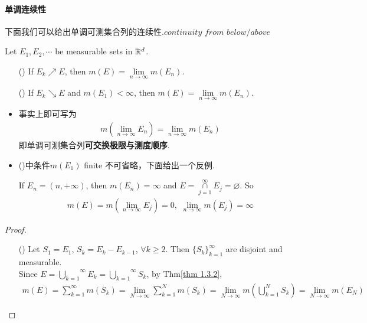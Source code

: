 \paragraph{单调连续性}
	下面我们可以给出单调可测集合列的连续性.$continuity \,\, from \,\, below / above$
	\begin{thm}\label{thm 1.3.3}
		Let $E_1 , E_2 , \cdots$ be measurable sets in $\mathbb{R}^d$.
		\begin{enumerate}
			\item[(\rmnum{1})]If $E_k \nearrow E$, then $m(E) = \underset{n \to \infty}{\lim}{m(E_n)}$.
			
			\item[(\rmnum{2})]If $E_k \searrow E$ and $m(E_1) < \infty$, then $m(E) = \underset{n \to \infty}{\lim}{m(E_n)}$.
		\end{enumerate}
	
		\begin{rmk}
			\begin{itemize}
				\item 事实上即可写为
				\begin{align}
					m(\lim_{n \to \infty}{E_n}) = \lim_{n \to \infty}{m(E_n)}
				\end{align}
				即单调可测集合列\textbf{可交换极限与测度顺序}.
				
				\item ()中条件$m(E_1)$ finite 不可省略，下面给出一个反例.
				\begin{example}
					If $E_n = (n , +\infty)$, then $m(E_n) = \infty$ and $E = \overset{\infty}{\underset{j = 1}{\cap}}{E_j} = \varnothing$. So
					\begin{align}
						m(E) = m(\lim_{n \to \infty}{E_j}) = 0 , \,\, \lim_{n \to \infty}{m(E_j)} = \infty
					\end{align}
				\end{example}
			\end{itemize}
			
		\end{rmk}
		
		\begin{proof}
			\begin{enumerate}
				\item[(\rmnum{1})]Let $S_1 = E_1$, $S_k = E_k - E_{k - 1}$, $\forall k \geq 2$. Then $\{ S_k \}_{k = 1}^{\infty}$ are disjoint and measurable.\\
				Since $E = \overset{\infty}{\underset{k = 1}{\bigcup}}{E_k} = \overset{\infty}{\underset{k = 1}{\bigcup}}{S_k}$, by Thm\ref{thm 1.3.2},
				\begin{align}
					m(E) = \sum_{k = 1}^{\infty}{m(S_k)} = \lim_{N \to \infty}{\sum_{k = 1}^{N}{m(S_k)}} = \lim_{N \to \infty}{m(\bigcup_{k = 1}^{N}{S_k})} = \lim_{N \to \infty}{m(E_N)}
				\end{align}
			

\end{enumerate}
\end{proof}
\end{thm}
